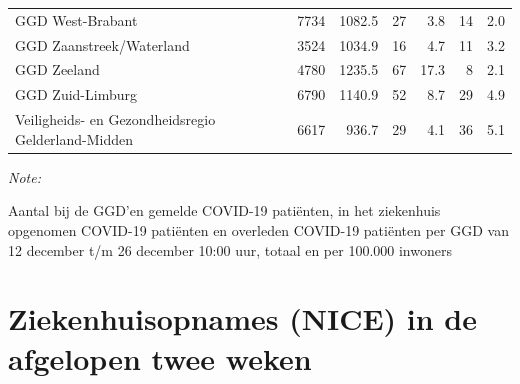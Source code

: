\documentclass[
  english,
  man,floatsintext]{apa6}
\begin{document}
\begin{table}
\begin{threeparttable}
\begin{tabular}{lrrrrrr}
GGD West-Brabant & 7734 & 1082.5 & 27 & 3.8 & 14 & 2.0\\
GGD Zaanstreek/Waterland & 3524 & 1034.9 & 16 & 4.7 & 11 & 3.2\\
GGD Zeeland & 4780 & 1235.5 & 67 & 17.3 & 8 & 2.1\\
GGD Zuid-Limburg & 6790 & 1140.9 & 52 & 8.7 & 29 & 4.9\\
Veiligheids- en Gezondheidsregio Gelderland-Midden & 6617 & 936.7 & 29 & 4.1 & 36 & 5.1\\
\bottomrule
\end{tabular}
\begin{tablenotes}
\item \textit{Note: } 
\item Aantal bij de GGD’en gemelde COVID-19 patiënten, in het ziekenhuis opgenomen COVID-19 patiënten en overleden COVID-19 patiënten per GGD van 12 december t/m 26 december 10:00 uur, totaal en per 100.000 inwoners
\end{tablenotes}
\end{threeparttable}
\endgroup{}
\end{table}

\newpage

\hypertarget{ziekenhuisopnames-nice-in-de-afgelopen-twee-weken}{%
\section{Ziekenhuisopnames (NICE) in de afgelopen twee weken}\label{ziekenhuisopnames-nice-in-de-afgelopen-twee-weken}}
\end{document}
